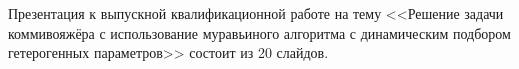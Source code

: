 
Презентация к выпускной квалификационной работе на тему <<Решение задачи коммивояжёра  с использование муравьиного алгоритма с динамическим подбором гетерогенных параметров>> состоит из 20 слайдов.